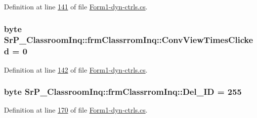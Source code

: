 \-Definition at line \hyperlink{_form1-dyn-ctrls_8cs_source_l00141}{141} of file \hyperlink{_form1-dyn-ctrls_8cs_source}{\-Form1-\/dyn-\/ctrls.\-cs}.

\hypertarget{class_sr_p___classroom_inq_1_1frm_classrrom_inq_a8b7285b1ee1626d8ebdc99d4bd6046a8}{
\subsubsection[{\-Conv\-View\-Times\-Clicked}]{\setlength{\rightskip}{0pt plus 5cm}byte {\bf \-Sr\-P\-\_\-\-Classroom\-Inq\-::frm\-Classrrom\-Inq\-::\-Conv\-View\-Times\-Clicked} = 0}}
\label{class_sr_p___classroom_inq_1_1frm_classrrom_inq_a8b7285b1ee1626d8ebdc99d4bd6046a8}


\-Definition at line \hyperlink{_form1-dyn-ctrls_8cs_source_l00142}{142} of file \hyperlink{_form1-dyn-ctrls_8cs_source}{\-Form1-\/dyn-\/ctrls.\-cs}.

\hypertarget{class_sr_p___classroom_inq_1_1frm_classrrom_inq_a9874b3534409b79a483f08f2aa03668d}{
\subsubsection[{\-Del\-\_\-\-I\-D}]{\setlength{\rightskip}{0pt plus 5cm}byte {\bf \-Sr\-P\-\_\-\-Classroom\-Inq\-::frm\-Classrrom\-Inq\-::\-Del\-\_\-\-I\-D} = 255}}
\label{class_sr_p___classroom_inq_1_1frm_classrrom_inq_a9874b3534409b79a483f08f2aa03668d}


\-Definition at line \hyperlink{_form1-dyn-ctrls_8cs_source_l00170}{170} of file \hyperlink{_form1-dyn-ctrls_8cs_source}{\-Form1-\/dyn-\/ctrls.\-cs}.

